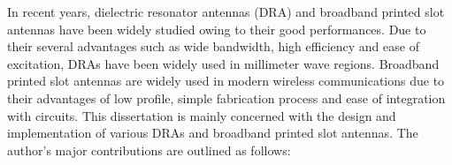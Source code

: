 
\begin{englishabstract}
	
	In recent years, dielectric resonator antennas (DRA) and broadband printed slot antennas have been widely studied owing to their good performances. Due to their several advantages such as wide bandwidth, high efficiency and ease of excitation, DRAs have been widely used in millimeter wave regions. Broadband printed slot antennas are widely used in modern wireless communications due to their advantages of low profile, simple fabrication process and ease of integration with circuits. This dissertation is mainly concerned with the design and implementation of various DRAs and broadband printed slot antennas. The author's major contributions are outlined as follows:
	
\end{englishabstract}


